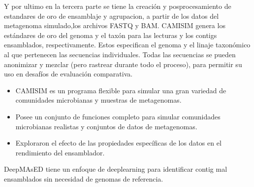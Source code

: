 Y por ultimo en la tercera parte se tiene la creación y posprocesamiento de estandares de oro de ensamblaje y agrupacion, a partir de los datos del metagenoma simulado,los archivos FASTQ y BAM. CAMISIM genera los estándares de oro del genoma y el taxón para las lecturas y los contigs ensamblados, respectivamente. Estos especifican el genoma y el linaje taxonómico al que pertenecen las secuencias individuales. Todas las secuencias se pueden anonimizar y mezclar (pero rastrear durante todo el proceso), para permitir su uso en desafíos de evaluación comparativa.  \\

\begin{itemize}
    \item CAMISIM es un programa flexible para simular una gran variedad de comunidades microbianas y muestras de metagenomas. 
    \item Posee un conjunto de funciones completo para simular comunidades microbianas realistas y conjuntos de datos de metagenomas.
    \item Exploraron el efecto de las propiedades específicas de los datos en el rendimiento del ensamblador.
\end{itemize}



DeepMAsED tiene un enfoque de deeplearning para identificar contig  mal ensamblados sin necesidad de genomas de referencia.\\



